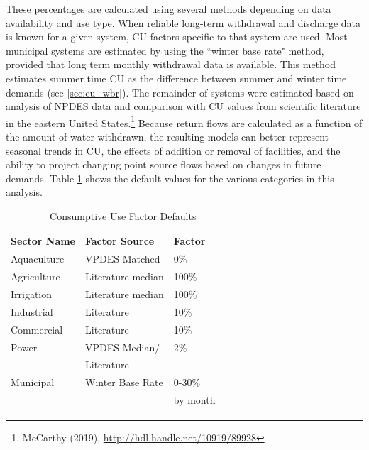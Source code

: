 \noindent These percentages are calculated using several methods depending on data availability and use type.  When reliable long-term withdrawal and discharge data is known for a given system, CU factors specific to that system are used.  Most municipal systems are estimated by using the ``winter base rate" method, provided that long term monthly withdrawal data is available.  This method estimates summer time CU as the difference between summer and winter time demands (see \ref{sec:cu_wbr}). The remainder of systems were estimated based on analysis of NPDES data and comparison with CU values from scientific literature in the eastern United States.\footnote{McCarthy (2019), \href{http://hdl.handle.net/10919/89928}{http://hdl.handle.net/10919/89928}} Because return flows are calculated as a function of the amount of water withdrawn, the resulting models can better represent seasonal trends in CU, the effects of addition or removal of facilities, and the ability to project changing point source flows based on changes in future demands.  Table \ref{tab:Consumptive Use Factor Defaults} shows the default values for the various categories in this analysis.
\bigskip

\vspace{-6mm}


\begin{table}[htp]

\caption{Consumptive Use Factor Defaults \hspace{250pt}}
\label{tab:Consumptive Use Factor Defaults}
\begin{tabular}{lllll}
\toprule
Sector Name & Factor Source                  & Factor \\
\midrule
\rowcolor{gray!6}  Aquaculture          & VPDES Matched                  & 0\% \\
Agriculture          & Literature median              & 100\%   \\
\rowcolor{gray!6} Irrigation           & Literature median              & 100\%     \\
Industrial           & Literature                     & 10\%    \\
\rowcolor{gray!6}  Commercial           & Literature             & 10\% \\
Power           & VPDES Median/            & 2\% \\
           & Literature            &  \\
\rowcolor{gray!6}  Municipal            & Winter Base Rate                     & 0-30\%   \\
\rowcolor{gray!6}              &                      & by month   \\
\bottomrule 
\end{tabular}
\end{table}



